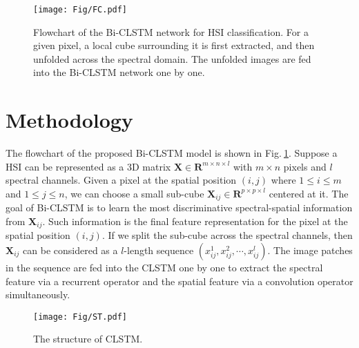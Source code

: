 \documentclass[12pt,onecolumn]{IEEEtran}
\begin{document}
\begin{spacing}{2}
\begin{figure}[htp]
  \centering
  \texttt{[image: Fig/FC.pdf]}\\
  \caption{Flowchart of the Bi-CLSTM network for HSI classification. For a given pixel, a local cube surrounding it is first extracted, and then unfolded across the spectral domain. The unfolded images are fed into the Bi-CLSTM network one by one.}\label{Flowchart}
\end{figure}
\section{Methodology}
The flowchart of the proposed Bi-CLSTM model is shown in Fig.$~$\ref{Flowchart}. Suppose a HSI can be represented as a 3D matrix $\mathbf{X}\in\mathbf{R}^{{m}\times{n}\times{l}}$ with ${m}\times{n}$ pixels and ${l}$ spectral channels. Given a pixel at the spatial position $({i,j})$ where $1\leq{i}\leq{m}$ and $1\leq{j}\leq{n}$, we can choose a small sub-cube $\mathbf{X}_{ij}\in \mathbf{R}^{{p}\times{p}\times{l}}$ centered at it. The goal of Bi-CLSTM is to learn the most discriminative spectral-spatial information from $\mathbf{X}_{ij}$. Such information is the final feature representation for the pixel at the spatial position $({i,j})$. If we split the sub-cube across the spectral channels, then $\mathbf{X}_{ij}$ can be considered as a ${l}$-length sequence $({x}^{1}_{ij},{x}^{2}_{ij},\cdots,{x}^{l}_{ij})$. The image patches in the sequence are fed into the CLSTM one by one to extract the spectral feature via a recurrent operator and the spatial feature via a convolution operator simultaneously.
\begin{figure}[htp]
  \centering
  \texttt{[image: Fig/ST.pdf]}\\
  \caption{The structure of CLSTM.}\label{structure}
\end{figure}


\end{spacing}
\end{document}
